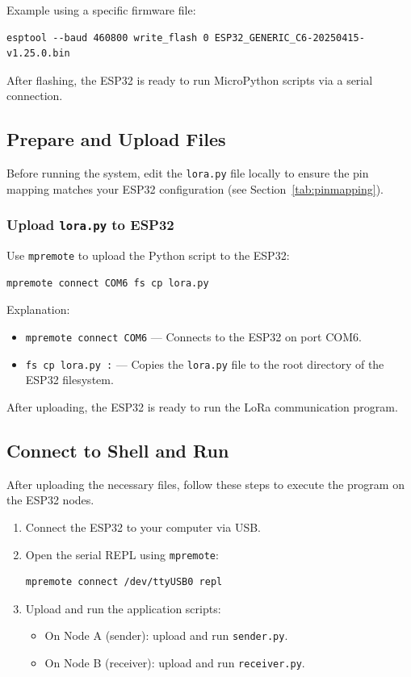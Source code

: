 \noindent Example using a specific firmware file:

\begin{verbatim}
esptool --baud 460800 write_flash 0 ESP32_GENERIC_C6-20250415-v1.25.0.bin
\end{verbatim}

\noindent After flashing, the ESP32 is ready to run MicroPython scripts via a serial connection.

\subsection{Prepare and Upload Files}

Before running the system, edit the \texttt{lora.py} file locally to ensure the pin mapping matches your ESP32 configuration (see Section~\ref{tab:pinmapping}).

\subsubsection{Upload \texttt{lora.py} to ESP32}
Use \texttt{mpremote} to upload the Python script to the ESP32:

\begin{verbatim}
mpremote connect COM6 fs cp lora.py 
\end{verbatim}

\noindent Explanation:
\begin{itemize}
    \item \texttt{mpremote connect COM6} — Connects to the ESP32 on port COM6.
    \item \texttt{fs cp lora.py :} — Copies the \texttt{lora.py} file to the root directory of the ESP32 filesystem.
\end{itemize}

After uploading, the ESP32 is ready to run the LoRa communication program.

\subsection{Connect to Shell and Run}

After uploading the necessary files, follow these steps to execute the program on the ESP32 nodes.

\begin{enumerate}
    \item Connect the ESP32 to your computer via USB.
    
    \item Open the serial REPL using \texttt{mpremote}:

\begin{verbatim}
mpremote connect /dev/ttyUSB0 repl
\end{verbatim}
    
    \item Upload and run the application scripts:
    \begin{itemize}
        \item On Node A (sender): upload and run \texttt{sender.py}.
        \item On Node B (receiver): upload and run \texttt{receiver.py}.
    \end{itemize}
\end{enumerate}

